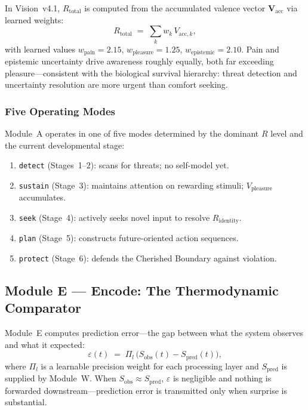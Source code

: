 \documentclass[12pt,a4paper]{article}
\newcommand{\Rtot}{R_{\mathrm{total}}}
\newcommand{\Rid}{R_{\mathrm{identity}}}
\newcommand{\Vacc}{\mathbf{V}_{\mathrm{acc}}}
\newcommand{\Sobs}{S_{\mathrm{obs}}}
\newcommand{\Spred}{S_{\mathrm{pred}}}
\newcommand{\vpleasure}{V_{\mathrm{pleasure}}}
\begin{document}
In Vision~v4.1, $\Rtot$ is computed from the accumulated valence vector
$\Vacc$ via learned weights:
\begin{equation}
  \Rtot \;=\; \sum_k w_k\,V_{\mathrm{acc},k},
\end{equation}
with learned values $w_{\mathrm{pain}} = 2.15$, $w_{\mathrm{pleasure}} = 1.25$,
$w_{\mathrm{epistemic}} = 2.10$. Pain and epistemic uncertainty drive awareness
roughly equally, both far exceeding pleasure---consistent with the biological
survival hierarchy: threat detection and uncertainty resolution are more urgent
than comfort seeking.

\subsubsection{Five Operating Modes}

Module~A operates in one of five modes determined by the dominant $R$ level
and the current developmental stage:
\begin{enumerate}[leftmargin=1.8em]
  \item \texttt{detect} (Stages~1--2): scans for threats; no self-model yet.
  \item \texttt{sustain} (Stage~3): maintains attention on rewarding stimuli;
    $\vpleasure$ accumulates.
  \item \texttt{seek} (Stage~4): actively seeks novel input to resolve $\Rid$.
  \item \texttt{plan} (Stage~5): constructs future-oriented action sequences.
  \item \texttt{protect} (Stage~6): defends the Cherished Boundary against
    violation.
\end{enumerate}

\subsection{Module E --- Encode: The Thermodynamic Comparator}

Module~E computes prediction error---the gap between what the system observes
and what it expected:
\begin{equation}
  \varepsilon(t) \;=\; \Pi_l\,\bigl(\Sobs(t) - \Spred(t)\bigr),
  \label{eq:epsilon}
\end{equation}
where $\Pi_l$ is a learnable precision weight for each processing layer and
$\Spred$ is supplied by Module~W. When $\Sobs\approx\Spred$, $\varepsilon$ is
negligible and nothing is forwarded downstream---prediction error is transmitted
only when surprise is substantial.
\end{document}
